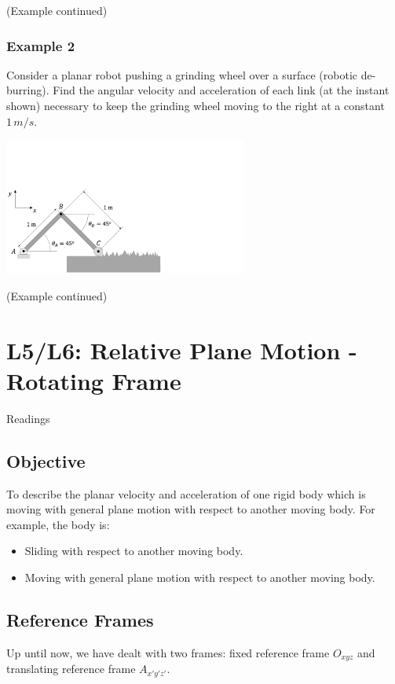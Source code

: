 \documentclass[12pt,letterpaper,twoside]{report}
\begin{document}
\newpage
(Example continued)

\vspace*{22\baselineskip}
\newpage

\subsection{Example 2}
Consider a planar robot pushing a grinding wheel over a surface (robotic de-burring). Find the angular velocity and acceleration of each link (at the instant shown) necessary to keep the grinding wheel moving to the right at a constant $1 \, m/s$.

\includegraphics[trim={0cm 0cm 12cm 7cm},clip,width=0.6\textwidth, left]{Slide29} 

\newpage
(Example continued)

\chapter{L5/L6: Relative Plane Motion - Rotating Frame}
Readings

\section{Objective}
To describe the planar velocity and acceleration of one rigid body which is moving with general plane motion with respect to another moving body.  For example, the body is:
\begin{itemize}
\item Sliding with respect to another moving body.
\item Moving with general plane motion with respect to another moving body. 
\end{itemize}

\section{Reference Frames}
Up until now, we have dealt with two frames: fixed reference frame $O_{xyz}$ and translating reference frame $A_{x'y'z'}$. 
\end{document}
